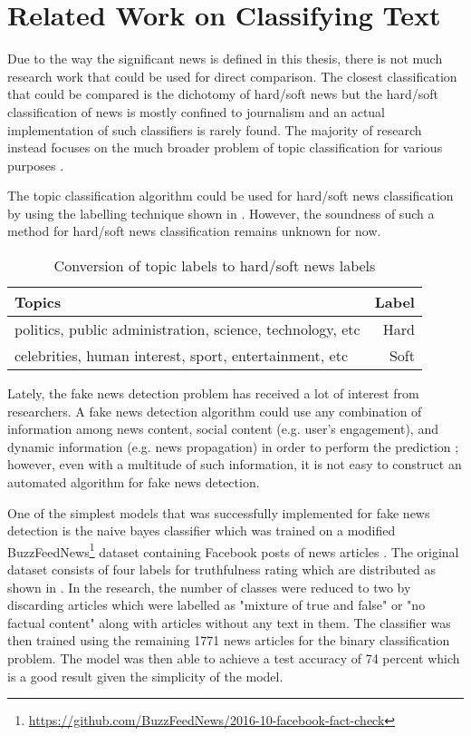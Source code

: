 \section{Related Work on Classifying Text} \label{related_works}
Due to the way the significant news is defined in this thesis, there is not much research work that could be used for direct comparison. The closest classification that could be compared is the dichotomy of hard/soft news but the hard/soft classification of news is mostly confined to journalism and an actual implementation of such classifiers is rarely found. The majority of research instead focuses on the much broader problem of topic classification for various purposes \cite{wang2012baselines, lee2011twitter, joachims1998text, nigam2000text}.

The topic classification algorithm could be used for hard/soft news classification by using the labelling technique shown in . However, the soundness of such a method for hard/soft news classification remains unknown for now.

\begin{table}[h]
\begin{center}
\caption{Conversion of topic labels to hard/soft news labels}
\label{tbl:topics_to_hard_soft}
\begin{tabular}{lr}
\toprule 
Topics&Label \\
\midrule 
politics, public administration, science, technology, etc & Hard\\
\hline
celebrities, human interest, sport, entertainment, etc & Soft\\
\bottomrule
\end{tabular}
\end{center}
\end{table}

Lately, the fake news detection problem has received a lot of interest from researchers. A fake news detection algorithm could use any combination of information among news content, social content (e.g. user's engagement), and dynamic information (e.g. news propagation) in order to perform the prediction \cite{shu2018fakenewsnet}; however, even with a multitude of such information, it is not easy to construct an automated algorithm for fake news detection\cite{shu2017fake}.

One of the simplest models that was successfully implemented for fake news detection is the naive bayes classifier which was trained on a modified BuzzFeedNews\footnote{\url{https://github.com/BuzzFeedNews/2016-10-facebook-fact-check}} dataset containing Facebook posts of news articles \cite{granik2017fake}. The original dataset consists of four labels for truthfulness rating which are distributed as shown in . In the research, the number of classes were reduced to two by discarding articles which were labelled as "mixture of true and false" or "no factual content" along with articles without any text in them. The classifier was then trained using the remaining 1771 news articles for the binary classification problem. The model was then able to achieve a test accuracy of 74 percent which is a good result given the simplicity of the model.

